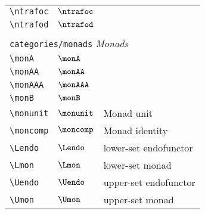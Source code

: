 \begin{longtable}{lll}
  {\color[rgb]{0.5,0.5,0.5}\texttt{\textbackslash ntrafoc}}                                                 & $\ntrafoc$                 & \\
  {\color[rgb]{0.5,0.5,0.5}\texttt{\textbackslash ntrafod}}                                                 & $\ntrafod$                 &                                                         \\
  &                            &                                                         \\
  \multicolumn{3}{l}{{\color[rgb]{0.5,0.5,0.5}\texttt{categories/monads}} \emph{Monads}}
  \\
  \hline
  {\color[rgb]{0.5,0.5,0.5}\texttt{\textbackslash monA}}                                                    & $\monA$                    & \\
  {\color[rgb]{0.5,0.5,0.5}\texttt{\textbackslash monAA}}                                                   & $\monAA$                   & \\
  {\color[rgb]{0.5,0.5,0.5}\texttt{\textbackslash monAAA}}                                                  & $\monAAA$                  & \\
  {\color[rgb]{0.5,0.5,0.5}\texttt{\textbackslash monB}}                                                    & $\monB$                    & \\
  {\color[rgb]{0.5,0.5,0.5}\texttt{\textbackslash monunit}}                                                 & $\monunit$                 & Monad unit\\
  {\color[rgb]{0.5,0.5,0.5}\texttt{\textbackslash moncomp}}                                                 & $\moncomp$                 & Monad identity\\
  {\color[rgb]{0.5,0.5,0.5}\texttt{\textbackslash Lendo}}                                                   & $\Lendo$                   & lower-set endofunctor\\
  {\color[rgb]{0.5,0.5,0.5}\texttt{\textbackslash Lmon}}                                                    & $\Lmon$                    & lower-set monad\\
  {\color[rgb]{0.5,0.5,0.5}\texttt{\textbackslash Uendo}}                                                   & $\Uendo$                   & upper-set endofunctor\\
  {\color[rgb]{0.5,0.5,0.5}\texttt{\textbackslash Umon}}                                                    & $\Umon$                    & upper-set monad                                         \\

\end{longtable}
